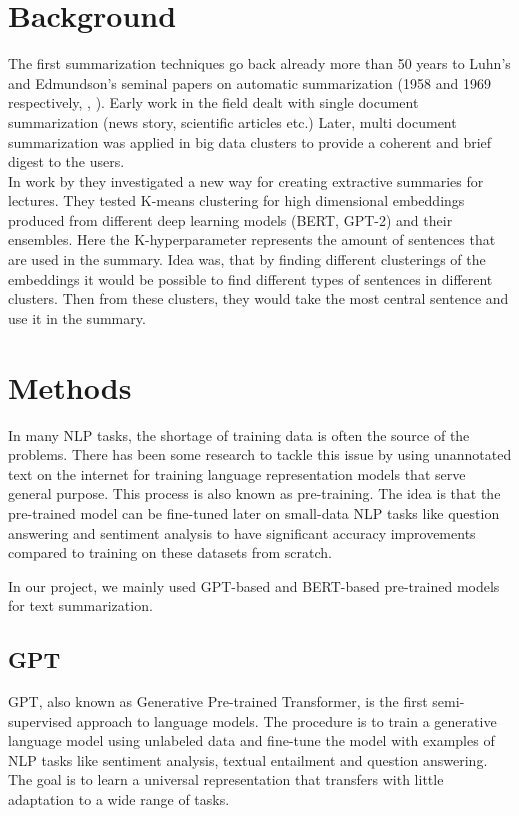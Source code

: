 \documentclass{article}
\begin{document}
\clearpage
\section{Background}
The first summarization techniques go back already more than 50 years to Luhn’s and Edmundson’s seminal papers on automatic summarization (1958 and 1969 respectively, \cite{textmining1958}, \cite{automaticextracting}). Early work in the field dealt with single document summarization (news story, scientific articles etc.) Later, multi document summarization was applied in big data clusters to provide a coherent and brief digest to the users. \\

In work by \cite{extractive_bert} they investigated a new way for creating extractive summaries for lectures. They tested K-means clustering for high dimensional embeddings produced from different deep learning models (BERT, GPT-2) and their ensembles. Here the K-hyperparameter represents the amount of sentences that are used in the summary. Idea was, that by finding different clusterings of the embeddings it would be possible to find different types of sentences in different clusters. Then from these clusters, they would take the most central sentence and use it in the summary. 


\clearpage
\section{Methods}

In many NLP tasks, the shortage of training data is often the source of the problems. There has been some research to tackle this issue by using unannotated text on the internet for training language representation models that serve general purpose. This process is also known as pre-training. The idea is that the pre-trained model can be fine-tuned later on small-data NLP tasks like question answering and sentiment analysis to have significant accuracy improvements compared to training on these datasets from scratch. 

In our project, we mainly used GPT-based and BERT-based pre-trained models for text summarization.

\subsection*{GPT}

GPT, also known as Generative Pre-trained Transformer, is the first semi-supervised approach to language models. The procedure is to train a generative language model using unlabeled data and fine-tune the model with examples of NLP tasks like sentiment analysis, textual entailment and question answering. The goal is to learn a universal representation that transfers with little adaptation to a wide range of tasks. \\
\end{document}
